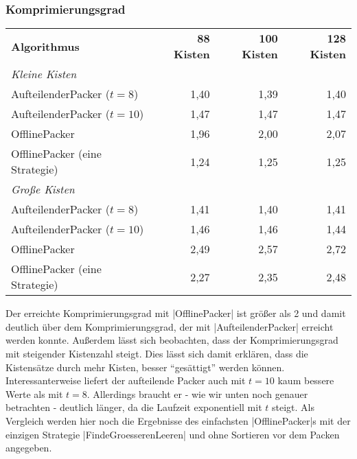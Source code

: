 \subsubsection*{Komprimierungsgrad}
\begin{center}
\begin{tabular}{lrrr}
\vspace*{.42em}
\textbf{Algorithmus} 	& \textbf{88 Kisten} 	& \textbf{100 Kisten} 	& \textbf{128 Kisten} 	\\
\textit{Kleine Kisten} & & & \\
 AufteilenderPacker ($t=8$)  	& 1,40		& 1,39			& 1,40			\\
 AufteilenderPacker ($t=10$)	& 1,47		& 1,47			& 1,47			\\
 OfflinePacker			& 1,96		& 2,00			& 2,07			\\
\vspace*{.42em}
 OfflinePacker (eine Strategie)	& 1,24		& 1,25			& 1,25			\\
\textit{Große Kisten} & & & \\
 AufteilenderPacker ($t=8$)  	& 1,41		& 1,40			& 1,41			\\
 AufteilenderPacker ($t=10$)	& 1,46		& 1,46			& 1,44			\\
 OfflinePacker			& 2,49		& 2,57			& 2,72			\\
 OfflinePacker (eine Strategie)	& 2,27		& 2,35			& 2,48			\\
\end{tabular}
\end{center}
 Der erreichte Komprimierungsgrad mit |OfflinePacker| ist größer als 2 und damit deutlich über dem Komprimierungsgrad, der mit |AufteilenderPacker|
  erreicht werden konnte. Außerdem lässt sich beobachten, dass der Komprimierungsgrad mit steigender Kistenzahl steigt.
 Dies lässt sich damit erklären, dass die Kistensätze durch mehr Kisten, besser ``gesättigt'' werden können. 
 Interessanterweise liefert der aufteilende Packer auch mit $t=10$ kaum bessere Werte als mit $t=8$.
 Allerdings braucht er - wie wir unten noch genauer betrachten - deutlich länger, da die Laufzeit exponentiell mit $t$ steigt.
 Als Vergleich werden hier noch die Ergebnisse des einfachsten |OfflinePacker|s mit der einzigen Strategie |FindeGroesserenLeeren| und ohne Sortieren vor dem Packen angegeben.

